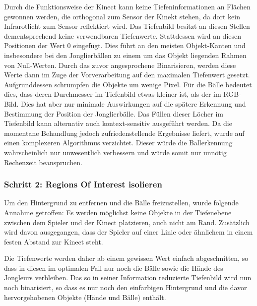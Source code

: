 \documentclass[12pt,a4paper,ngerman]{scrartcl}
\begin{document}
Durch die Funktionsweise der Kinect kann keine Tiefeninformationen an Flächen gewonnen werden, die orthogonal zum Sensor der Kinekt stehen, da dort kein Infrarotlicht zum Sensor reflektiert wird.
Das Tiefenbild besitzt an diesen Stellen dementsprechend keine verwendbaren Tiefenwerte. Stattdessen wird an diesen Positionen der Wert 0 eingefügt. Dies führt an den meisten Objekt-Kanten und insbesondere bei den Jonglierbällen zu einem um das Objekt liegenden Rahmen von Null-Werten. Durch das zuvor angesprochene Binarisieren, werden diese Werte dann im Zuge der Vorverarbeitung auf den maximalen Tiefenwert gesetzt. Aufgrunddessen schrumpfen die Objekte um wenige Pixel. Für die Bälle bedeutet dies, dass deren Durchmesser im Tiefenbild etwas kleiner ist, als der im RGB-Bild. Dies hat aber nur minimale Auswirkungen auf die spätere Erkennung und Bestimmung der Position der Jonglierbälle.
Das Füllen dieser Löcher im Tiefenbild kann alternativ auch kontext-sensitiv ausgeführt werden. Da die momentane Behandlung jedoch zufriedenstellende Ergebnisse liefert, wurde auf einen komplexeren Algorithmus verzichtet. Dieser würde die Ballerkennung wahrscheinlich nur unwesentlich verbessern und würde somit nur unnötig Rechenzeit beanspruchen.

\subsubsection{Schritt 2: Regions Of Interest isolieren}
\label{sec:roi}

Um den Hintergrund zu entfernen und die Bälle freizustellen, wurde folgende Annahme getroffen: Es werden möglichst keine Objekte in der Tiefenebene zwischen dem Spieler und der Kinect platzieren, auch nicht am Rand. Zusätzlich wird davon ausgegangen, dass der Spieler auf einer Linie oder ähnlichem in einem festen Abstand zur Kinect steht.

Die Tiefenwerte werden daher ab einem gewissen Wert einfach abgeschnitten, so dass in diesen im optimalen Fall nur noch die Bälle sowie die Hände des
Jongleurs verbleiben. Das so in seiner Information reduzierte Tiefenbild wird nun noch binarisiert, so dass
es nur noch den einfarbigen Hintergrund und die davor hervorgehobenen Objekte (Hände und Bälle) enthält.
\end{document}

